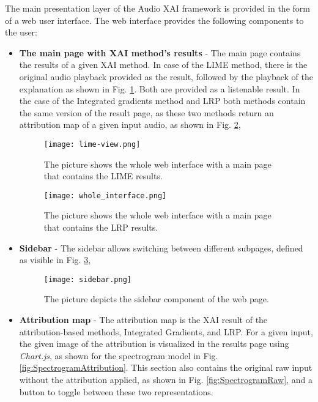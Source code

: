 \documentclass[
    bindingoffset=5mm,  %
    footnoteindent=3mm, %
    hyphenation=true    %
]{src/wut-thesis}
\begin{document}
The main presentation layer of the Audio XAI framework is provided in the form of a web user interface.
The web interface provides the following components to the user:
\begin{itemize}
    \item \textbf{The main page with XAI method's results} - The main page contains the results of a given XAI
        method. In case of the LIME method, there is the original audio playback provided as the result,
        followed by the playback of the explanation as shown in Fig. \ref{fig:LimeView}.
        Both are provided as a listenable result. In the case of the Integrated gradients method and LRP
        both methods contain the same version of the result page, as these two methods return an
        attribution map of a given input audio, as shown in Fig. \ref{fig:WholeInterface},
\begin{figure}[h!]
    \centering
    \texttt{[image: lime-view.png]}
    \caption{The picture shows the whole web interface with a main page that contains the LIME results.}
    \label{fig:LimeView}
\end{figure}

\begin{figure}[h!]
    \centering
    \texttt{[image: whole\_interface.png]}
    \caption{The picture shows the whole web interface with a main page that contains the LRP results.}
    \label{fig:WholeInterface}
\end{figure}    

    \item \textbf{Sidebar} - The sidebar allows switching between different subpages,
        defined as visible in Fig. \ref{fig:Sidebar},

\begin{figure}[h!] %
    \centering
    \texttt{[image: sidebar.png]}
    \caption{The picture depicts the sidebar component of the web page.}
    \label{fig:Sidebar}
\end{figure}
    
    \item \textbf{Attribution map} - The attribution map is the XAI result of the attribution-based methods,
        Integrated Gradients, and LRP. For a given input, the given image of the attribution is visualized
        in the results page using \emph{Chart.js}, as shown for the spectrogram model
        in Fig. \ref{fig:SpectrogramAttribution}.
        This section also contains the original raw input without the attribution applied,
        as shown in Fig. \ref{fig:SpectrogramRaw}, and a button to toggle between these 
        two representations.


\end{itemize}
\end{document}
